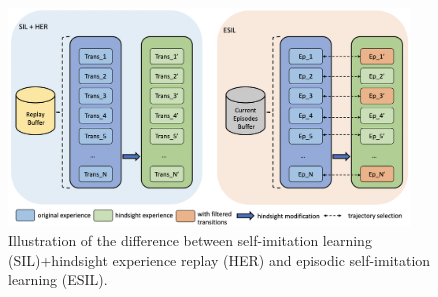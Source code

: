 \begin{figure}[t]
\centering
\includegraphics[width=0.95\textwidth]{figures/chapter3/buffer.png}
\caption[Illustration between SIL+HER and ESIL.]{Illustration of the difference between self-imitation learning (SIL)+hindsight experience replay (HER) and episodic self-imitation learning (ESIL).}
\label{fig:esil}
\end{figure}

